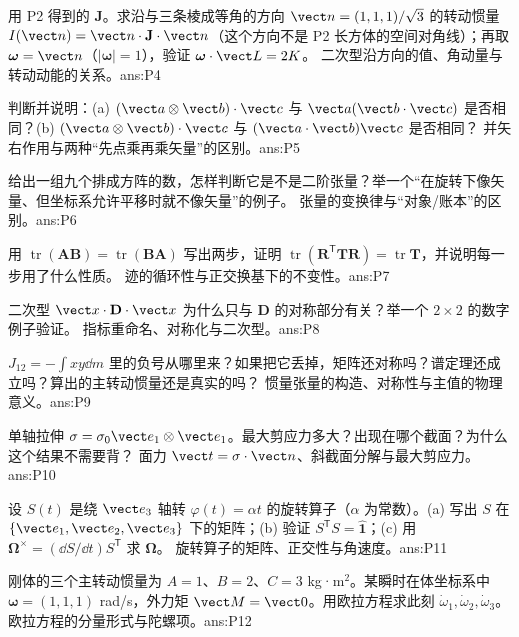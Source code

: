 \documentclass[11pt]{ctexart}
\newcommand{\ten}[1]{\mathbf{#1}}
\newcommand{\unitd}{\hat{\ten{1}}}
\newcommand{\tr}{\operatorname{tr}}
\begin{document}
{用 P2 得到的 $\ten J$。求沿与三条棱成等角的方向 $\vect n=(1,1,1)/\sqrt3$ 的转动惯量 $I(\vect n)=\vect n\cdot\ten J\cdot\vect n$（这个方向不是 P2 长方体的空间对角线）；再取 $\boldsymbol\omega=\vect n$（$|\boldsymbol\omega|=1$），验证 $\boldsymbol\omega\cdot\vect L=2K$。}
{二次型沿方向的值、角动量与转动动能的关系。}{ans:P4}

{判断并说明：(a) $(\vect a\otimes\vect b)\cdot\vect c$ 与 $\vect a(\vect b\cdot\vect c)$ 是否相同？(b) $(\vect a\otimes\vect b)\cdot\vect c$ 与 $(\vect a\cdot\vect b)\vect c$ 是否相同？}
{并矢右作用与两种“先点乘再乘矢量”的区别。}{ans:P5}

{给出一组九个排成方阵的数，怎样判断它是不是二阶张量？举一个“在旋转下像矢量、但坐标系允许平移时就不像矢量”的例子。}
{张量的变换律与“对象/账本”的区别。}{ans:P6}

{用 $\tr(\ten A\ten B)=\tr(\ten B\ten A)$ 写出两步，证明 $\tr(\ten R^{\mathsf T}\ten T\ten R)=\tr\ten T$，并说明每一步用了什么性质。}
{迹的循环性与正交换基下的不变性。}{ans:P7}

{二次型 $\vect x\cdot\ten D\cdot\vect x$ 为什么只与 $\ten D$ 的对称部分有关？举一个 $2\times2$ 的数字例子验证。}
{指标重命名、对称化与二次型。}{ans:P8}

{$J_{12}=-\int xy\dd m$ 里的负号从哪里来？如果把它丢掉，矩阵还对称吗？谱定理还成立吗？算出的主转动惯量还是真实的吗？}
{惯量张量的构造、对称性与主值的物理意义。}{ans:P9}

{单轴拉伸 $\ten\sigma=\sigma_0\vect e_1\otimes\vect e_1$。最大剪应力多大？出现在哪个截面？为什么这个结果不需要背？}
{面力 $\vect t=\ten\sigma\cdot\vect n$、斜截面分解与最大剪应力。}{ans:P10}

{设 $S(t)$ 是绕 $\vect e_3$ 轴转 $\varphi(t)=\alpha t$ 的旋转算子（$\alpha$ 为常数）。(a) 写出 $S$ 在 $\{\vect e_1,\vect e_2,\vect e_3\}$ 下的矩阵；(b) 验证 $S^{\mathsf T}S=\unitd$；(c) 用 $\boldsymbol\Omega^{\times}=(\dd S/\dd t)S^{\mathsf T}$ 求 $\boldsymbol\Omega$。}
{旋转算子的矩阵、正交性与角速度。}{ans:P11}

{刚体的三个主转动惯量为 $A=1$、$B=2$、$C=3$ kg·m$^2$。某瞬时在体坐标系中 $\boldsymbol\omega=(1,1,1)$ rad/s，外力矩 $\vect M=\vect0$。用欧拉方程求此刻 $\dot\omega_1,\dot\omega_2,\dot\omega_3$。}
{欧拉方程的分量形式与陀螺项。}{ans:P12}
\end{document}
